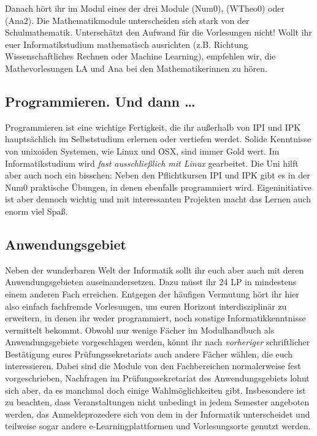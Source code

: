 Danach hört ihr im Modul  eines der drei Module  (\gls{Num0}),  (\gls{WTheo0}) oder  (\gls{Ana2}). Die Mathematikmodule unterscheiden sich stark von der Schulmathematik. Unterschätzt den Aufwand für die Vorlesungen nicht! Wollt ihr euer Informatikstudium mathematisch ausrichten (z.B. Richtung Wissenschaftliches Rechnen oder Machine Learning), empfehlen wir, die Mathevorlesungen \gls{LA} und \gls{Ana} bei den Mathematikerinnen zu hören.

\subsection{Programmieren. Und dann \dots}

Programmieren ist eine wichtige Fertigkeit, die ihr außerhalb von \gls{IPI} und \gls{IPK} hauptsächlich im Selbststudium erlernen oder vertiefen werdet. Solide Kenntnisse von unixoiden Systemen, wie Linux und OSX, sind immer Gold wert. Im Informatikstudium wird \emph{fast ausschließlich mit Linux} gearbeitet. Die Uni hilft aber auch noch ein bisschen: Neben den Pflichtkursen \gls{IPI} und \gls{IPK} gibt es in der \gls{Num0} praktische Übungen, in denen ebenfalls programmiert wird. Eigeninitiative ist aber dennoch wichtig und mit interessanten Projekten macht das Lernen auch enorm viel Spaß.

\subsection{Anwendungsgebiet}

Neben der wunderbaren Welt der Informatik sollt ihr euch aber auch mit deren Anwendungsgebieten auseinandersetzen. Dazu müsst ihr 24 \gls{LP} in mindestens einem anderen Fach erreichen. Entgegen der häufigen Vermutung hört ihr hier also einfach fachfremde Vorlesungen, um euren Horizont interdisziplinär zu erweitern, in denen ihr weder programmiert, noch sonstige Informatikkenntnisse vermittelt bekommt. Obwohl nur wenige Fächer im Modulhandbuch als Anwendungsgebiete vorgeschlagen werden, könnt ihr nach \emph{vorheriger} schriftlicher Bestätigung eures Prüfungssekretariats auch andere Fächer wählen, die euch interessieren. Dabei sind die Module von den Fachbereichen normalerweise fest vorgeschrieben, Nachfragen im Prüfungssekretariat des Anwendungsgebiets lohnt sich aber, da es manchmal doch einige Wahlmöglichkeiten gibt. Insbesondere ist zu beachten, dass Veranstaltungen nicht unbedingt in jedem Semester angeboten werden, das Anmeldeprozedere sich von dem in der Informatik unterscheidet und teilweise sogar andere e-Learningplattformen und Vorlesungsorte genutzt werden.

